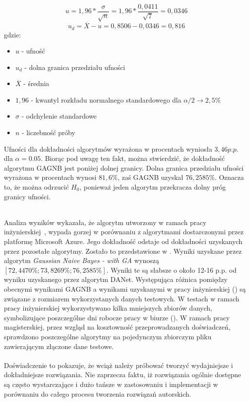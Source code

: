 \begin{itemize}
    \begin{equation}
        \label{eq:uf}
        u = 1,96 * \frac{\sigma}{\sqrt{n}} = 1,96*\frac{0,0411}{\sqrt{7}} = 0,0346
    \end{equation}
    \begin{equation}
        \label{eq:uf-d}
        u_d = \overline{X} - u = 0,8506 - 0,0346 = 0,816
    \end{equation}
    gdzie:
    \begin{itemize}
        \item $u$ - ufność
        \item $u_d$ - dolna granica przedziału ufności
        \item $\overline{X}$ - średnia
        \item $1,96$ - kwantyl rozkładu normalnego standardowego dla $\alpha/2 \rightarrow 2,5\%$
        \item $\sigma$ - odchylenie standardowe
        \item $n$ - liczebność próby
    \end{itemize}

    Ufności dla dokładności algorytmów wyrażona w procentach wyniosła $3,46 p.p.$ dla $\alpha = 0.05$. Biorąc pod uwagę ten fakt, można stwierdzić, że dokładność algorytmu GAGNB jest poniżej dolnej granicy. Dolna granica przedziału ufności wyrażona w procentach wynosi $81,6\%$, zaś GAGNB uzyskał $76,2585\%$. Oznacza to, że można odrzucić $H_0$, ponieważ jeden algorytm przekracza dolny próg granicy ufności. \\
\end{itemize}
\ \\
Analiza wyników wykazała, że algorytm utworzony w ramach pracy inżynierskiej~\cite{Blyszcz2022}, wypada gorzej w porównaniu z algorytmami dostarczonymi przez platformę Microsoft Azure. Jego dokładność odstaje od dokładności uzyskanych przez pozostałe algorytmy. Zostało to przedstawione w . Wyniki uzyskane przez algorytm \textit{Gaussian Naive Bayes - with GA} wynoszą $[72,4470\%; 73,8269\%; 76,2585\%]$. Wyniki te są słabsze o około 12-16 p.p. od wyniku uzyskanego przez algorytm DANet. Występująca różnica pomiędzy obecnymi wynikami GAGNB a wynikami uzyskanymi w pracy inżynierskiej () są związane z rozmiarem wykorzystanych danych testowych. W testach w ramach pracy inżynierskiej wykorzystywano kilka mniejszych zbiorów danych, symbolizujące poszczególne dni robocze pracy w biurze (). W ramach pracy magisterskiej, przez wzgląd na kosztowność przeprowadzanych doświadczeń, sprawdzono poszczególne algorytmy na pojedynczym zbiorczym pliku zawierającym złączone dane testowe.
\\ \\
Doświadczenie to pokazuje, że wciąż należy próbować tworzyć wydajniejsze i dokładniejsze rozwiązania. Nie zaprzecza faktu, iż rozwiązania ogólnie dostępne są często wystarczające i dużo tańsze w zastosowaniu i implementacji w porównaniu do całego procesu tworzenia rozwiązań autorskich.